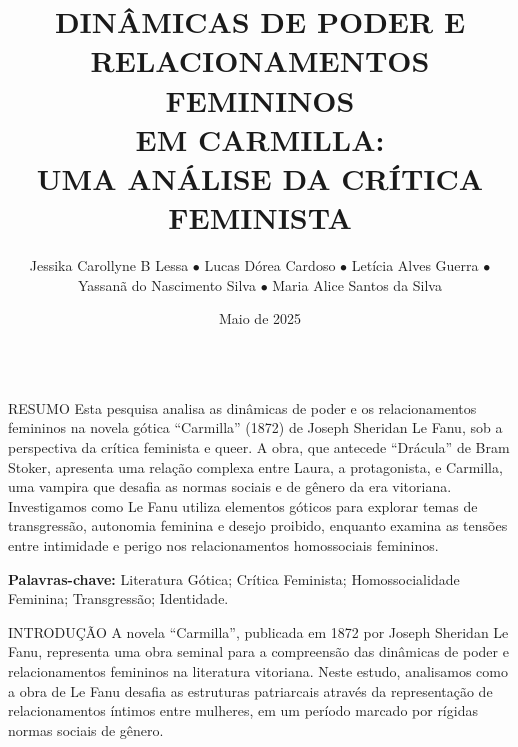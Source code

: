 \documentclass[final,a0paper,portrait]{beamer}
\title{\textcolor{azultitulo}{DINÂMICAS DE PODER E RELACIONAMENTOS FEMININOS \\ EM CARMILLA:\\ UMA ANÁLISE DA CRÍTICA FEMINISTA}}
\author{Jessika Carollyne B Lessa \quad $\bullet$ \quad Lucas Dórea Cardoso \quad $\bullet$ \quad Letícia Alves Guerra \quad $\bullet$ \\
\vspace{0.3cm}
Yassanã do Nascimento Silva \quad $\bullet$ \quad Maria Alice Santos da Silva}
\institute{Literatura Inglesa e Norte-Americana (Noturno) \\ Profa. Dra. Dayse Rayane e Silva Muniz \\ Centro Universitário do Distrito Federal (UDF)}
\date{Maio de 2025}
\begin{document}
\begin{frame}[t]
\begin{columns}[t]
\begin{column}{0.98\textwidth}
\centering
\vspace{1cm}
{\inserttitle\par}
\vspace{0.8cm}
{\insertauthor\par}
\vspace{0.8cm}
{\insertinstitute\par}
\vspace{0.5cm}
\end{column}
\end{columns}

\vspace{1cm}

\begin{columns}[t]
\begin{column}{0.31\textwidth}
\begin{block}{\centering RESUMO}
Esta pesquisa analisa as dinâmicas de poder e os relacionamentos femininos na novela gótica ``Carmilla'' (1872) de Joseph Sheridan Le Fanu, sob a perspectiva da crítica feminista e queer. A obra, que antecede ``Drácula'' de Bram Stoker, apresenta uma relação complexa entre Laura, a protagonista, e Carmilla, uma vampira que desafia as normas sociais e de gênero da era vitoriana. Investigamos como Le Fanu utiliza elementos góticos para explorar temas de transgressão, autonomia feminina e desejo proibido, enquanto examina as tensões entre intimidade e perigo nos relacionamentos homossociais femininos.

\vspace{0.5cm}
\textbf{Palavras-chave:} Literatura Gótica; Crítica Feminista; Homossocialidade Feminina; Transgressão; Identidade.
\end{block}

\begin{block}{\centering INTRODUÇÃO}
A novela ``Carmilla'', publicada em 1872 por Joseph Sheridan Le Fanu, representa uma obra seminal para a compreensão das dinâmicas de poder e relacionamentos femininos na literatura vitoriana. Neste estudo, analisamos como a obra de Le Fanu desafia as estruturas patriarcais através da representação de relacionamentos íntimos entre mulheres, em um período marcado por rígidas normas sociais de gênero.


\end{block}
\end{column}
\end{columns}
\end{frame}
\end{document}

